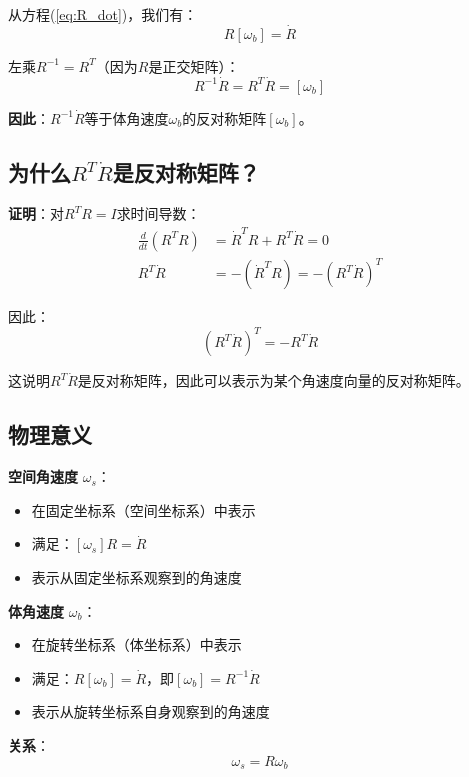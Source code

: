 \documentclass[12pt,a4paper]{article}
\begin{document}
从方程(\ref{eq:R_dot})，我们有：
\begin{equation}
R [\omega_b] = \dot{R}
\end{equation}

左乘$R^{-1} = R^T$（因为$R$是正交矩阵）：
\begin{equation}
R^{-1} \dot{R} = R^T \dot{R} = [\omega_b]
\label{eq:R_inv_R_dot}
\end{equation}

\textbf{因此}：$R^{-1}\dot{R}$等于体角速度$\omega_b$的反对称矩阵$[\omega_b]$。

\subsection{为什么$R^T \dot{R}$是反对称矩阵？}

\textbf{证明}：对$R^T R = I$求时间导数：
\begin{align}
\frac{d}{dt}(R^T R) &= \dot{R}^T R + R^T \dot{R} = 0 \\
R^T \dot{R} &= -(\dot{R}^T R) = -(R^T \dot{R})^T
\end{align}

因此：
\begin{equation}
(R^T \dot{R})^T = -R^T \dot{R}
\end{equation}

这说明$R^T \dot{R}$是反对称矩阵，因此可以表示为某个角速度向量的反对称矩阵。

\subsection{物理意义}

\textbf{空间角速度} $\omega_s$：
\begin{itemize}
\item 在固定坐标系（空间坐标系）中表示
\item 满足：$[\omega_s] R = \dot{R}$
\item 表示从固定坐标系观察到的角速度
\end{itemize}

\textbf{体角速度} $\omega_b$：
\begin{itemize}
\item 在旋转坐标系（体坐标系）中表示
\item 满足：$R [\omega_b] = \dot{R}$，即$[\omega_b] = R^{-1} \dot{R}$
\item 表示从旋转坐标系自身观察到的角速度
\end{itemize}

\textbf{关系}：
\begin{equation}
\omega_s = R \omega_b
\label{eq:omega_relation}
\end{equation}
\end{document}
